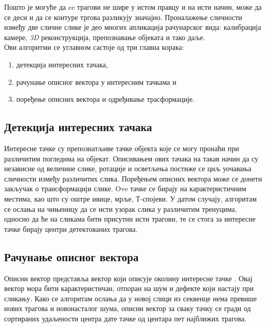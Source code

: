 \documentclass[12pt,a4paper,serbian,oneside]{book}
\begin{document}
Пошто је могуће да ce трагови не шире у истом правцу и на исти начин, може да се деси и да се контуре тргова разликују значајно.  Проналажење сличности између две сличне слике је део многих апликација рачунарског вида: калибрација камере, \textit{3D} реконструкција, препознавање објеката и тако даље. \\

Ови алгоритми се  углавном састоје од три главна корака:
\begin{enumerate}
  \item детекција интересних тачака,
  \item рачунање описног вектора у интересним тачкама и
  \item поређење описних вектора и одређивање трасформације.
\end{enumerate}

\subsection{Детекција интересних тачака}

Интересне тачке су препознатљиве тачке објекта које се могу пронаћи при различитим погледима на објекат. Описивањем ових тачака на такав начин да су независне од величине слике, ротације и осветљења постиже се циљ уочавања сличности између различитих слика. Поређењем описних вектора може се донети закључак о трансформацији слике. Ove тачке  се бирају на карактеристичним местима, као што су оштре ивице, мрље, Т-спојеви. У датом случају, алгоритам се ослања на чињеницу да се исти узорак слика у различитим тренуцима, односно да ће на сликама бити присутни исти трагови,  те се стога за интересне тачке бирају центри детектованих трагова.

\subsection{Рачунање описног вектора}

Описни вектор представља вектор који описује околину интересне тачке . Овај вектор мора бити карактеристичан, отпоран на шум и дефекте који настају при сликању. Како се алгоритам ослања да у новој слици из секвенце нема превише нових трагова и новонасталог шума, описни вектор за сваку тачку се гради од сортираних удаљености центра дате тачке од центара пет најближих трагова.
\end{document}
